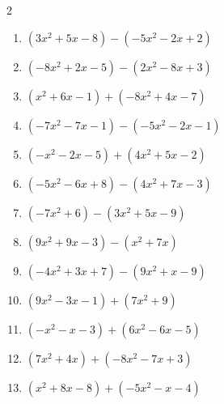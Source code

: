 \begin{multicols}{2}
\begin{enumerate}

  \item $(3x^{2}+5x-8)-(-5x^{2}-2x+2)$


  \item $(-8x^{2}+2x-5)-(2x^{2}-8x+3)$


\columnbreak %

  \item $(x^{2}+6x-1)+(-8x^{2}+4x-7)$


  \item $(-7x^{2}-7x-1)-(-5x^{2}-2x-1)$


  \item $(-x^{2}-2x-5)+(4x^{2}+5x-2)$


  \item $(-5x^{2}-6x+8)-(4x^{2}+7x-3)$


  \item $(-7x^{2}+6)-(3x^{2}+5x-9)$


  \item $(9x^{2}+9x-3)-(x^{2}+7x)$


  \item $(-4x^{2}+3x+7)-(9x^{2}+x-9)$


  \item $(9x^{2}-3x-1)+(7x^{2}+9)$


  \item $(-x^{2}-x-3)+(6x^{2}-6x-5)$


  \item $(7x^{2}+4x)+(-8x^{2}-7x+3)$


  \item $(x^{2}+8x-8)+(-5x^{2}-x-4)$



\end{enumerate}
\end{multicols}
